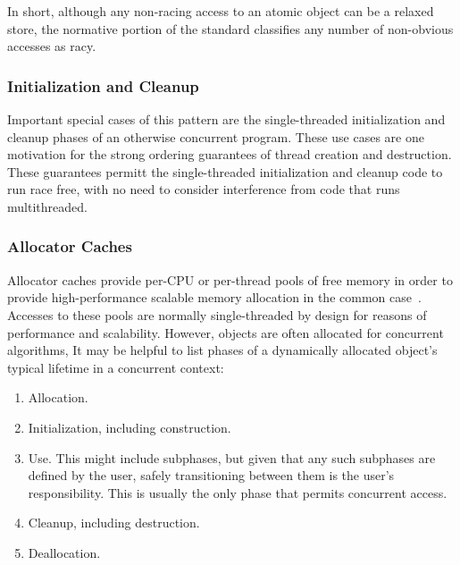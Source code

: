 \documentclass[10]{article}
\begin{document}
In short, although any non-racing access to an atomic object can be a
relaxed store, the normative portion of the standard classifies any
number of non-obvious accesses as racy.


\subsubsection{Initialization and Cleanup}
\label{sec:Initialization and Cleanup}

Important special cases of this pattern are the single-threaded
initialization and cleanup phases of an otherwise concurrent program.
These use cases are one motivation for the strong ordering guarantees
of thread creation and destruction.
These guarantees permitt the single-threaded initialization and cleanup
code to run race free, with no need to consider interference from
code that runs multithreaded.

\subsubsection{Allocator Caches}
\label{sec:Allocator Caches}

Allocator caches provide per-CPU or per-thread pools of free memory
in order to provide high-performance scalable memory allocation in
the common case~\cite{McKenney93}.
Accesses to these pools are normally single-threaded by design for
reasons of performance and scalability.
However, objects are often allocated for concurrent algorithms,
It may be helpful to list phases of a dynamically allocated object's
typical lifetime in a concurrent context:

\begin{enumerate}
\item	Allocation.
\item	Initialization, including construction.
\item	Use.
	This might include subphases, but given that any such
	subphases are defined by the user, safely transitioning between
	them is the user's responsibility.
	This is usually the only phase that permits concurrent access.
\item	Cleanup, including destruction.
\item	Deallocation.
\end{enumerate}
\end{document}
